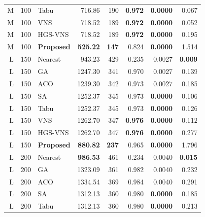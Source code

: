 \begin{longtable}{@{}rrlrrrrr@{}}
M & 100 & Tabu & 716.86 & 190 & \textbf{0.972} & \textbf{0.0000} & 0.067 \\

M & 100 & VNS & 718.52 & 189 & \textbf{0.972} & \textbf{0.0000} & 0.052 \\

M & 100 & HGS-VNS & 718.52 & 189 & \textbf{0.972} & \textbf{0.0000} & 0.195 \\
\rowcolor{gray!10}
M & 100 & \textbf{Proposed} & \textbf{525.22} & \textbf{147} & 0.824 & \textbf{0.0000} & 1.514 \\
\addlinespace[2pt]

L & 150 & Nearest & 943.23 & 429 & 0.235 & 0.0027 & \textbf{0.009} \\

L & 150 & GA & 1247.30 & 341 & 0.970 & 0.0027 & 0.139 \\

L & 150 & ACO & 1239.30 & 342 & 0.973 & 0.0027 & 0.185 \\

L & 150 & SA & 1252.37 & 345 & 0.973 & \textbf{0.0000} & 0.106 \\

L & 150 & Tabu & 1252.37 & 345 & 0.973 & \textbf{0.0000} & 0.126 \\

L & 150 & VNS & 1262.70 & 347 & \textbf{0.976} & \textbf{0.0000} & 0.112 \\

L & 150 & HGS-VNS & 1262.70 & 347 & \textbf{0.976} & \textbf{0.0000} & 0.277 \\
\rowcolor{gray!10}
L & 150 & \textbf{Proposed} & \textbf{880.82} & \textbf{237} & 0.965 & \textbf{0.0000} & 1.796 \\
\addlinespace[2pt]

L & 200 & Nearest & \textbf{986.53} & 461 & 0.234 & 0.0040 & \textbf{0.015} \\

L & 200 & GA & 1323.09 & 361 & 0.982 & 0.0040 & 0.232 \\

L & 200 & ACO & 1334.54 & 369 & 0.984 & 0.0040 & 0.291 \\

L & 200 & SA & 1312.13 & 360 & 0.980 & \textbf{0.0000} & 0.185 \\

L & 200 & Tabu & 1312.13 & 360 & 0.980 & \textbf{0.0000} & 0.213 \\


\end{longtable}

